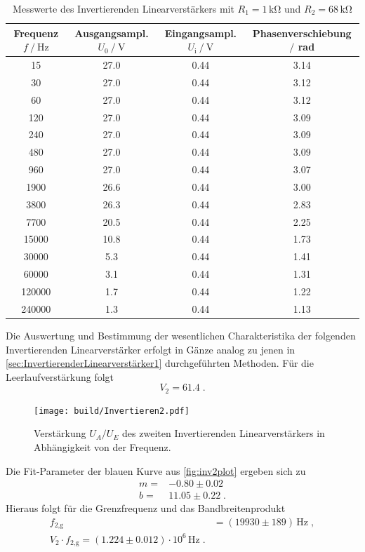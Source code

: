 \begin{table}
    \centering
    \caption{Messwerte des Invertierenden Linearverstärkers mit $R_1=1\,\unit{\kilo\ohm}$ und $R_2=68\,\unit{\kilo\ohm}$}
    \begin{tabular}{c c c c}
        \toprule
        Frequenz $f\mathbin{/}\unit{\hertz}$ & Ausgangsampl. $U_0\mathbin{/}\unit{\volt}$& Eingangsampl. $U_{\text{i}}\mathbin{/}\unit{\volt}$ & Phasenverschiebung $\mathbin{/}$ rad\\
        \midrule
        15&	27.0&	0.44&	3.14\\		    
        30&	27.0&	0.44&	3.12\\		
        60&	27.0&	0.44&	3.12\\		
        120&	27.0&	0.44&	3.09\\		
        240&	27.0&	0.44&	3.09\\		
        480	&27.0&	0.44&	3.09\\		
        960	&27.0&	0.44&	3.07\\		
        1900&	26.6&	0.44&	3.00\\	
        3800& 26.3&	0.44&	2.83\\	
        7700&	20.5&	0.44&	2.25\\	
        15000&	10.8&	0.44&	1.73\\	
        30000&	5.3&	0.44&	1.41	\\	
        60000&	3.1	&0.44&	1.31	\\	
        120000&	1.7	&0.44&	1.22	\\	
        240000&	1.3	&0.44&	1.13	\\
        \bottomrule
    \end{tabular}
    \label{tab:InvAmp2}
\end{table}
Die Auswertung und Bestimmung der wesentlichen Charakteristika der folgenden Invertierenden Linearverstärker erfolgt in Gänze analog zu jenen in \autoref{sec:InvertierenderLinearverstärker1} durchgeführten Methoden.
Für die Leerlaufverstärkung folgt
\begin{equation*}
    V_2= 61.4\; .
\end{equation*}
\begin{figure}
    \centering
    \texttt{[image: build/Invertieren2.pdf]}
    \caption{Verstärkung $U_A/U_E$ des zweiten Invertierenden Linearverstärkers in Abhängigkeit von der Frequenz.}
    \label{fig:inv2plot}
\end{figure}
Die Fit-Parameter der blauen Kurve aus \autoref{fig:inv2plot} ergeben sich zu
\begin{align*}
    m=&-0.80\pm 0.02 \\
    b=& 11.05\pm 0.22\; .
\end{align*}
Hieraus folgt für die Grenzfrequenz und das Bandbreitenprodukt
\begin{align*}
    f_{2\text{,g}}&= (19930 \pm 189 )\, \unit{\hertz}\; ,\\
    V_2\cdot f_{2\text{,g}}=(1.224\pm 0.012)\cdot 10^{6}\, \unit{\hertz}\;.
\end{align*}
